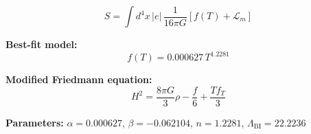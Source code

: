 
\begin{equation}
  S = \int d^4x \, |e| \, \frac{1}{16\pi G} \left[ f(T) + \mathcal{L}_m \right]
\end{equation}

\textbf{Best-fit model:}
\begin{equation}
  f(T) = 0.000627 \, T^{1.2281}
\end{equation}

\textbf{Modified Friedmann equation:}
\begin{equation}
  H^2 = \frac{8\pi G}{3} \rho - \frac{f}{6} + \frac{T f_T}{3}
\end{equation}

\textbf{Parameters:}
$\alpha = 0.000627$, \quad
$\beta = -0.062104$, \quad
$n = 1.2281$, \quad
$\Lambda_{\text{BI}} = 22.2236$